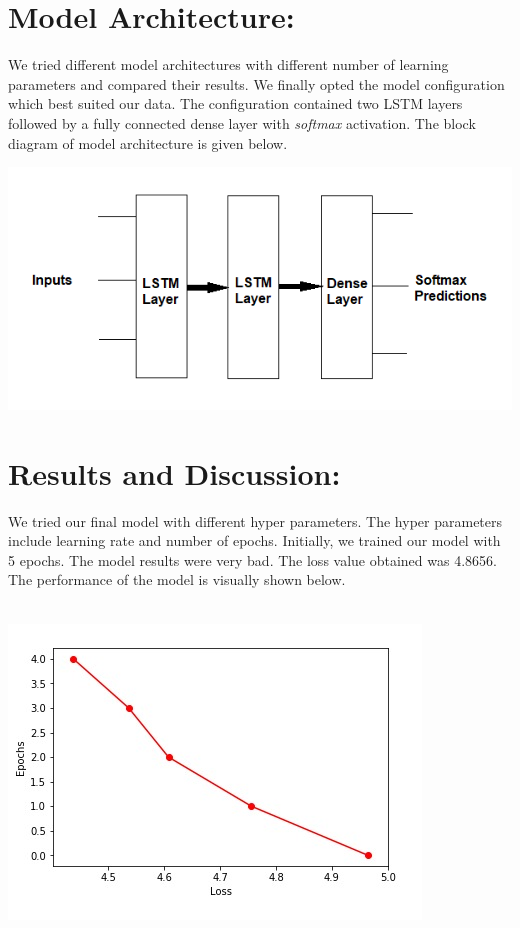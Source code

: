 \documentclass{proc}
\begin{document}
\section*{Model Architecture:}
We tried different model architectures with different number of learning parameters and compared their results. We finally opted the model configuration which best suited our data. The configuration contained two LSTM layers followed by a fully connected dense layer with \textit{softmax} activation. The block diagram of model architecture is given below.
\begin{center}
	\includegraphics[scale=0.50]{./assets/model-architecture}
\end{center}

\section*{Results and Discussion:}
We tried our final model with different hyper parameters. The hyper parameters include learning rate and number of epochs. Initially, we trained our model with 5 epochs. The model results were very bad. The loss value obtained was 4.8656. The performance of the model is visually shown below. \\ \\
\begin{center}
	\includegraphics[scale=0.50]{./assets/train-1}
\end{center}
\end{document}
